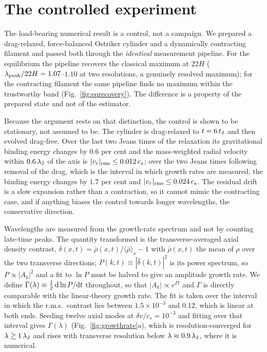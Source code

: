 \documentclass[usenatbib,twoside,twocolumn]{mnras}
\begin{document}
\section{The controlled experiment}
\label{sec:control}


The load-bearing numerical result is a control, not a campaign. We prepared a drag-relaxed, force-balanced Ostriker cylinder and a dynamically contracting filament and passed both through the \emph{identical} measurement pipeline. For the equilibrium the pipeline recovers the classical maximum at $22H$ ($\lambda_{\rm peak}/22H=1.07$--$1.10$ at two resolutions, a genuinely resolved maximum); for the contracting filament the same pipeline finds no maximum within the trustworthy band (Fig.~\ref{fig:eqrecovery}). The difference is a property of the prepared state and not of the estimator.

Because the argument rests on that distinction, the control is shown to be stationary, not assumed to be. The cylinder is drag-relaxed to $t=6\,t_{\rm J}$ and then evolved drag-free. Over the last two Jeans times of the relaxation its gravitational binding energy changes by $0.6$ per cent and the mass-weighted radial velocity within $0.6\,\lambda_{\rm J}$ of the axis is $|v_r|_{\rm rms}\leq0.012\,c_s$; over the two Jeans times following removal of the drag, which is the interval in which growth rates are measured, the binding energy changes by $1.7$ per cent and $|v_r|_{\rm rms}\leq0.024\,c_s$. The residual drift is a slow expansion rather than a contraction, so it cannot mimic the contracting case, and if anything biases the control towards longer wavelengths, the conservative direction.

Wavelengths are measured from the growth-rate spectrum and not by counting late-time peaks. The quantity transformed is the transverse-averaged axial density contrast, $\delta(x,t)=\bar\rho(x,t)/\langle\bar\rho\rangle_x-1$ with $\bar\rho(x,t)$ the mean of $\rho$ over the two transverse directions; $P(k,t)\equiv|\hat\delta(k,t)|^2$ is its power spectrum, so $P\propto|A_k|^2$ and a fit to $\ln P$ must be halved to give an amplitude growth rate. We define $\Gamma(\lambda)\equiv\tfrac12\,{\rm d}\ln P/{\rm d}t$ throughout, so that $|A_k|\propto e^{\Gamma t}$ and $\Gamma$ is directly comparable with the linear-theory growth rate. The fit is taken over the interval in which the r.m.s.\ contrast lies between $1.5\times10^{-3}$ and $0.12$, which is linear at both ends. Seeding twelve axial modes at $\delta v/c_s=10^{-3}$ and fitting over that interval gives $\Gamma(\lambda)$ (Fig.~\ref{fig:growthrate}a), which is resolution-converged for $\lambda\gtrsim1\,\lambda_{\rm J}$ and rises with transverse resolution below $\lambda\approx0.9\,\lambda_{\rm J}$, where it is numerical.
\end{document}
